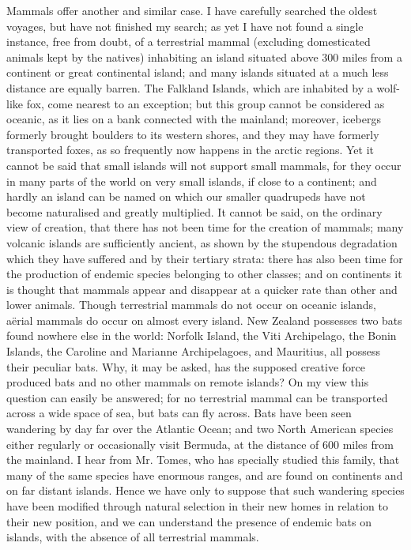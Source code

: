 \indent Mammals offer another and similar case. I have carefully searched the oldest voyages, but have not finished my search; as yet I have not found a single instance, free from doubt, of a terrestrial mammal (excluding domesticated animals kept by the natives) inhabiting an island situated above 300 miles from a continent or great continental island; and many islands situated at a much less distance are equally barren. The Falkland Islands, which are inhabited by a wolf-like fox, come nearest to an exception; but this group cannot be considered as oceanic, as it lies on a bank connected with the mainland; moreover, icebergs formerly brought boulders to its western shores, and they may have formerly transported foxes, as so frequently now happens in the arctic regions. Yet it cannot be said that small islands will not support small mammals, for they occur in many parts of the world on very small islands, if close to a continent; and hardly an island can be named on which our smaller quadrupeds have not become naturalised and greatly multiplied. It cannot be said, on the ordinary view of creation, that there has not been time for the creation of mammals; many volcanic islands are sufficiently ancient, as shown by the stupendous degradation which they have suffered and by their tertiary strata: there has also been time for the production of endemic species belonging to other classes; and on continents it is thought that mammals appear and disappear at a quicker rate than other and lower animals.  Though terrestrial mammals do not occur on oceanic islands, a\"{e}rial mammals do occur on almost every island. New Zealand possesses two bats found nowhere else in the world: Norfolk Island, the Viti Archipelago, the Bonin Islands, the Caroline and Marianne Archipelagoes, and Mauritius, all possess their peculiar bats. Why, it may be asked, has the supposed creative force produced bats and no other mammals on remote islands? On my view this question can easily be answered; for no terrestrial mammal can be transported across a wide space of sea, but bats can fly across. Bats have been seen wandering by day far over the Atlantic Ocean; and two North American species either regularly or occasionally visit Bermuda, at the distance of 600 miles from the mainland. I hear from Mr. Tomes, who has specially studied this family, that many of the same species have enormous ranges, and are found on continents and on far distant islands. Hence we have only to suppose that such wandering species have been modified through natural selection in their new homes in relation to their new position, and we can understand the presence of endemic bats on islands, with the absence of all terrestrial mammals.~\\
